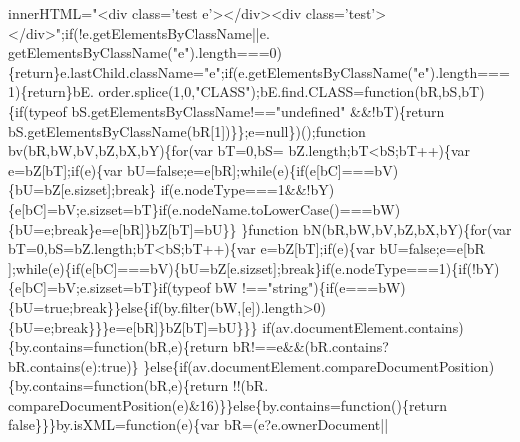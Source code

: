 \begin{DoxyCode}
      innerHTML=\textcolor{stringliteral}{"<div class='test e'></div><div class='test'></div>"};\textcolor{keywordflow}{if}(!e.getElementsByClassName||e.
      getElementsByClassName(\textcolor{stringliteral}{"e"}).length===0)\{\textcolor{keywordflow}{return}\}e.lastChild.className=\textcolor{stringliteral}{"e"};\textcolor{keywordflow}{if}(e.getElementsByClassName(\textcolor{stringliteral}{"e"}).length===1)\{\textcolor{keywordflow}{return}\}bE.
      order.splice(1,0,\textcolor{stringliteral}{"CLASS"});bE.find.CLASS=\textcolor{keyword}{function}(bR,bS,bT)\{\textcolor{keywordflow}{if}(typeof bS.getElementsByClassName!==\textcolor{stringliteral}{"undefined"}
      &&!bT)\{\textcolor{keywordflow}{return} bS.getElementsByClassName(bR[1])\}\};e=null\})();\textcolor{keyword}{function} bv(bR,bW,bV,bZ,bX,bY)\{\textcolor{keywordflow}{for}(var bT=0,bS=
      bZ.length;bT<bS;bT++)\{var e=bZ[bT];\textcolor{keywordflow}{if}(e)\{var bU=\textcolor{keyword}{false};e=e[bR];\textcolor{keywordflow}{while}(e)\{\textcolor{keywordflow}{if}(e[bC]===bV)\{bU=bZ[e.sizset];\textcolor{keywordflow}{break}\}\textcolor{keywordflow}{
      if}(e.nodeType===1&&!bY)\{e[bC]=bV;e.sizset=bT\}\textcolor{keywordflow}{if}(e.nodeName.toLowerCase()===bW)\{bU=e;\textcolor{keywordflow}{break}\}e=e[bR]\}bZ[bT]=bU\}\}
      \}\textcolor{keyword}{function} bN(bR,bW,bV,bZ,bX,bY)\{\textcolor{keywordflow}{for}(var bT=0,bS=bZ.length;bT<bS;bT++)\{var e=bZ[bT];\textcolor{keywordflow}{if}(e)\{var bU=\textcolor{keyword}{false};e=e[bR
      ];\textcolor{keywordflow}{while}(e)\{\textcolor{keywordflow}{if}(e[bC]===bV)\{bU=bZ[e.sizset];\textcolor{keywordflow}{break}\}\textcolor{keywordflow}{if}(e.nodeType===1)\{\textcolor{keywordflow}{if}(!bY)\{e[bC]=bV;e.sizset=bT\}\textcolor{keywordflow}{if}(typeof bW
      !==\textcolor{stringliteral}{"string"})\{\textcolor{keywordflow}{if}(e===bW)\{bU=\textcolor{keyword}{true};\textcolor{keywordflow}{break}\}\}\textcolor{keywordflow}{else}\{\textcolor{keywordflow}{if}(by.filter(bW,[e]).length>0)\{bU=e;\textcolor{keywordflow}{break}\}\}\}e=e[bR]\}bZ[bT]=bU\}\}\}\textcolor{keywordflow}{
      if}(av.documentElement.contains)\{by.contains=\textcolor{keyword}{function}(bR,e)\{\textcolor{keywordflow}{return} bR!==e&&(bR.contains?bR.contains(e):\textcolor{keyword}{true})\}
      \}\textcolor{keywordflow}{else}\{\textcolor{keywordflow}{if}(av.documentElement.compareDocumentPosition)\{by.contains=\textcolor{keyword}{function}(bR,e)\{\textcolor{keywordflow}{return} !!(bR.
      compareDocumentPosition(e)&16)\}\}\textcolor{keywordflow}{else}\{by.contains=\textcolor{keyword}{function}()\{\textcolor{keywordflow}{return} \textcolor{keyword}{false}\}\}\}by.isXML=\textcolor{keyword}{function}(e)\{var bR=(e?e.ownerDocument||

\end{DoxyCode}
